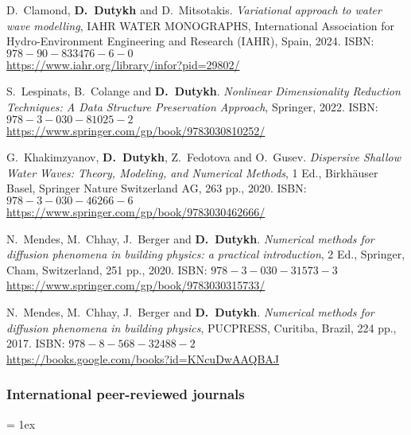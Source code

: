 \documentclass[final, a4paper, oneside, 12pt]{article}
\numberwithin{equation}{section}
\begin{document}
\begin{etaremune}

  \item D.~Clamond, \textbf{D.~Dutykh} and D.~Mitsotakis. \textit{Variational approach to water wave modelling}, IAHR WATER MONOGRAPHS, International Association for Hydro-Environment Engineering and Research (IAHR), Spain, 2024. ISBN: $978-90-833476-6-0$ \\
  \url{https://www.iahr.org/library/infor?pid=29802/}

  \item S.~Lespinats, B.~Colange and \textbf{D.~Dutykh}. \textit{Nonlinear Dimensionality Reduction Techniques: A Data Structure Preservation Approach}, Springer, 2022. ISBN: $978-3-030-81025-2$ \\
  \url{https://www.springer.com/gp/book/9783030810252/}

  \item G.~Khakimzyanov, \textbf{D.~Dutykh}, Z.~Fedotova and O.~Gusev. \textit{Dispersive Shallow Water Waves: Theory, Modeling, and Numerical Methods}, 1 Ed., Birkh\"auser Basel, Springer Nature Switzerland AG, 263 pp., 2020. ISBN: $978-3-030-46266-6$ \\
  \url{https://www.springer.com/gp/book/9783030462666/}

  \item N.~Mendes, M.~Chhay, J.~Berger and \textbf{D.~Dutykh}. \textit{Numerical methods for diffusion phenomena in building physics: a practical introduction}, 2 Ed., Springer, Cham, Switzerland, 251 pp., 2020. ISBN: $978-3-030-31573-3$ \\
  \url{https://www.springer.com/gp/book/9783030315733/}

  \item N.~Mendes, M.~Chhay, J.~Berger and \textbf{D.~Dutykh}. \textit{Numerical methods for diffusion phenomena in building physics}, PUCPRESS, Curitiba, Brazil, 224 pp., 2017. ISBN: $978-8-568-32488-2$ \\
  \url{https://books.google.com/books?id=KNcuDwAAQBAJ}
  
\end{etaremune}

\subsubsection{International peer-reviewed journals}

\listpartsep = 1ex
\end{document}

